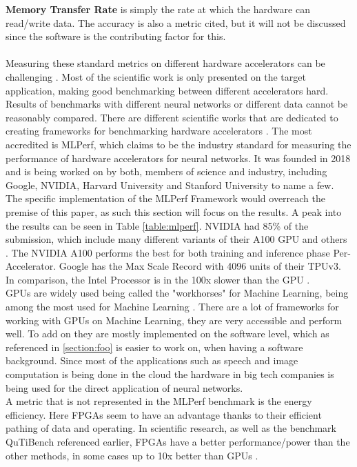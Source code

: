 \documentclass[conference]{IEEEtran}
\begin{document}
	\textbf{Memory Transfer Rate} is simply the rate at which the hardware can read/write data.
	The accuracy is also a metric cited, but it will not be discussed since the software is the contributing factor for this.
	\\
	\\
	Measuring these standard metrics on different hardware accelerators can be challenging \cite{capra2020updated}. Most of the scientific work is only presented on the target application, making good benchmarking between different accelerators hard. Results of benchmarks with different neural networks or different data cannot be reasonably compared.
	There are different scientific works that are dedicated to creating frameworks for benchmarking hardware accelerators \cite{chen2012benchnn} \cite{zhu2018benchmarking} \cite{blott2019qutibench} \cite{dong2017dnnmark}. The most accredited is MLPerf, which claims to be the industry standard for measuring the performance of hardware accelerators for neural networks\cite{mattson2020mlperf}. It was founded in 2018 and is being worked on by both, members of science and industry, including Google, NVIDIA, Harvard University and Stanford University to name a few. The specific implementation of the MLPerf Framework would overreach the premise of this paper, as such this section will focus on the results.
	A peak into the results can be seen in Table \ref{table:mlperf}. NVIDIA had 85\% of the submission, which include many different variants of their A100 GPU and others \cite{mlperfresultshpc}. The NVIDIA A100 performs the best for both training and inference phase Per-Accelerator. Google has the Max Scale Record with 4096 units of their TPUv3. In comparison, the Intel Processor is in the 100x slower than the GPU \cite{mlperfresultsnvidia}. 
	\\
	GPUs are widely used being called the "workhorses" for Machine Learning\cite{capra2020updated}, being among the most used for Machine Learning \cite{mostusedgpu}. There are a lot of frameworks for working with GPUs on Machine Learning, they are very accessible and perform well. To add on they are mostly implemented on the software level, which as referenced in \autoref{section:foo} is easier to work on, when having a software background.  Since most of the applications such as speech and image computation is being done in the cloud \cite{sze2017efficient} the hardware in big tech companies is being used for the direct application of neural networks.
	\\
	A metric that is not represented in the MLPerf benchmark is the energy efficiency. Here FPGAs seem to have an advantage thanks to their efficient pathing of data and operating. In scientific research, as well as the benchmark QuTiBench\cite{blott2019qutibench} referenced earlier, FPGAs have a better performance/power than the other methods, in some cases up to 10x better than GPUs \cite{ovtcharov2015accelerating} \cite{capra2020updated}. 
\end{document}
